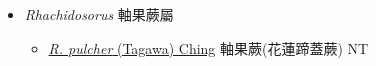 
  \begin{itemize}
 \item[] \textit{Rhachidosorus} 軸果蕨屬
                    
  \begin{itemize}
        \item[] \href{http://www.theplantlist.org/tpl1.1/search?q=Rhachidosorus+pulcher}{\textit{R. pulcher} (Tagawa) Ching}     軸果蕨(花蓮蹄蓋蕨)   NT
  \end{itemize}
  \end{itemize}
